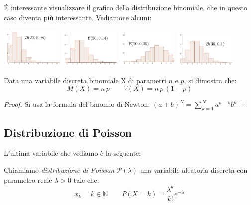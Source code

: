 \'E interessante visualizzare il grafico della distribuzione binomiale, che in questo caso diventa più interessante. Vediamone alcuni:

\begin{center}
  \includegraphics[width=0.22\textwidth]{img/binomiale1.png}
  \includegraphics[width=0.22\textwidth]{img/binomiale2.png}
  \includegraphics[width=0.22\textwidth]{img/binomiale3.png}
  \includegraphics[width=0.22\textwidth]{img/binomiale4.png}
\end{center}

\begin{proprieta} Data una variabile discreta binomiale X di parametri \(n\) e \(p\), si dimostra che: 
\[\boxed{M(X) = n \,p} \qquad \boxed{V(X) = n \,p\,(1-p)}\]
\end{proprieta}

\begin{proof} Si usa la formula del binomio di Newton: \quad \(\displaystyle (a+b)^N = \sum_{k=1}^N a^{n-k} b^k\)
\end{proof}



\subsection{Distribuzione di Poisson}
L'ultima variabile che vediamo è la seguente:

\begin{definizione} Chiamiamo \emph{distribuzione di Poisson} \(\mathcal{P}(\lambda)\) una variabile aleatoria discreta con parametro reale \(\lambda >0\) tale che:
\[ x_k = k \in \mathbb{N} \qquad P(X=k)= \dfrac{\lambda^k}{k!} e^{-\lambda}\]
\end{definizione}

